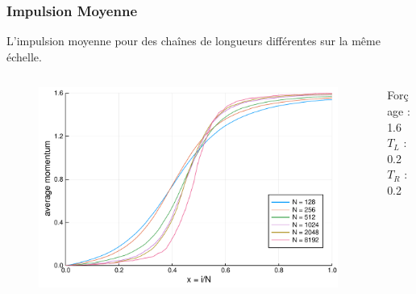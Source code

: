 \begin{frame}

    \frametitle{Impulsion Moyenne}

    L'impulsion moyenne pour des chaînes de longueurs différentes
    sur la même échelle.

    \begin{columns}

        \begin{column}{0.8\textwidth}
            \begin{figure}
                \includegraphics[scale=0.4]{plots/average_momentum_scaled.pdf}
            \end{figure}
        \end{column}

        \begin{column}{0.2\textwidth}
            \scriptsize
            Forçage : 1.6 \\
            $T_L$ : 0.2 \\
            $T_R$ : 0.2
        \end{column}

    \end{columns}

\end{frame}

